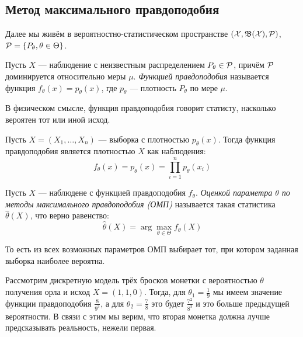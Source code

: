 \subsection{Метод максимального правдоподобия}

\begin{note}
	Далее мы живём в вероятностно-статистическом пространстве $(\mathcal{X}, \mathfrak{B}(\mathcal{X}), \mathcal{P})$, $\mathcal{P} = \{P_\theta, \theta \in \Theta\}$.
\end{note}

\begin{definition}
	Пусть $X$ --- наблюдение с неизвестным распределением $P_\theta \in \mathcal{P}$, причём $\mathcal{P}$ доминируется относительно меры $\mu$. \textit{Функцией правдоподобия} называется функция $f_\theta(x) = p_\theta(x)$, где $p_\theta$ --- плотность $P_\theta$ по мере $\mu$.
\end{definition}

\begin{anote}
	В физическом смысле, функция правдоподобия говорит статисту, насколько вероятен тот или иной исход.
\end{anote}

\begin{example}
	Пусть $X = (X_1, \ldots, X_n)$ --- выборка с плотностью $p_\theta(x)$. Тогда функция правдоподобия является плотностью $X$ как наблюдения:
	\[
		f_\theta(x) = p_\theta(x) = \prod_{i = 1}^n p_\theta(x_i)
	\]
\end{example}

\begin{definition}
	Пусть $X$ --- наблюдене с функцией правдоподобия $f_\theta$. \textit{Оценкой параметра $\theta$ по методы максимального правдоподобия (ОМП)} называется такая статистика $\hat{\theta}(X)$, что верно равенство:
	\[
		\hat{\theta}(X) = \arg\max_{\theta \in \Theta} f_\theta(X)
	\]
\end{definition}

\begin{anote}
	То есть из всех возможных параметров ОМП выбирает тот, при котором заданная выборка наиболее вероятна.
\end{anote}

\begin{example}
	Рассмотрим дискретную модель трёх бросков монетки с вероятностью $\theta$ получения орла и исход $X = (1, 1, 0)$. Тогда, для $\theta_1 = \frac{1}{9}$ мы имеем значение функции правдоподобия $\frac{8}{9^3}$, а для $\theta_2 = \frac{7}{8}$ это будет $\frac{7^2}{8^3}$ и это больше предыдущей вероятности. В связи с этим мы верим, что вторая монетка должна лучше предсказывать реальность, нежели первая.
\end{example}

